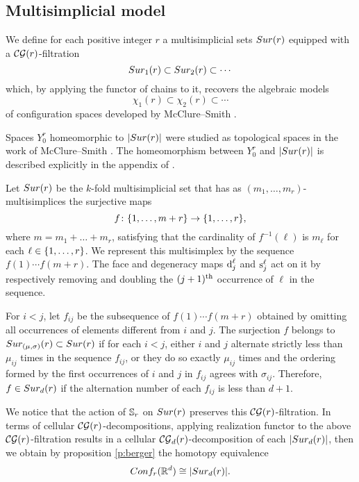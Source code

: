 
\subsection{Multisimplicial model}\label{ss:surjection model}

We define for each positive integer $r$ a multisimplicial sets $Sur(r)$ equipped with a $\mathcal{CG}(r)$-filtration
\[
Sur_{1}(r) \subset Sur_{2}(r) \subset \dotsb
\]
which, by applying the functor of chains to it, recovers the algebraic models
\[
\chi_1(r) \subset \chi_2(r) \subset \dotsb
\]
of configuration spaces developed by McClure--Smith \cite{mcluresmith2004geomodel}.

Spaces $Y_0^r$ homeomorphic to $\lvert Sur(r)\rvert$ were studied as topological spaces in the work of McClure--Smith \cite{mcclure2003multivariable}.
The homeomorphism between $Y_0^r$ and $\lvert Sur(r)\rvert$ is described explicitly in the appendix of \cite{salvatore2009deligne}.

Let $Sur(r)$ be the $k$-fold multisimplicial set that has as $(m_1,\dots,m_r)$-multisimplices the surjective maps
\[
f \colon \{1,\dots,m+r\} \to \{1,\dots,r\},
\]
where $m = m_1+\dots+m_r$, satisfying that the cardinality of $f^{-1}(\ell)$ is $m_\ell$ for each $\ell \in \{1,\dots,r\}$.
We represent this multisimplex by the sequence $f(1) \dotsm f(m+r)$.
The face and degeneracy maps $\operatorname{d}^\ell_j$ and $\operatorname{s}^\ell_j$ act on it by respectively removing and doubling the $(j+1)^{\mathrm{th}}$ occurrence of $\ell$ in the sequence.

For $i<j$, let $f_{ij}$ be the subsequence of $f(1) \dotsm f(m+r)$ obtained by omitting all occurrences of elements different from $i$ and $j$.
The surjection $f$ belongs to $Sur_{(\mu,\sigma)}(r) \subset Sur(r)$ if for each $i<j$, either $i$ and $j$ alternate strictly less than $\mu_{ij}$ times in the sequence $f_{ij}$, or they do so exactly $\mu_{ij}$ times and the ordering formed by the first occurrences of $i$ and $j$ in $f_{ij}$ agrees with $\sigma_{ij}$.
Therefore, $f \in Sur_{d}(r)$ if the alternation number of each $f_{ij}$ is less than $d+1$.

We notice that the action of $\mathbb{S}_r$ on $Sur(r)$ preserves this $\mathcal{CG}(r)$-filtration.
In terms of cellular $\mathcal{CG}(r)$-decompositions, applying realization functor to the above $\mathcal{CG}(r)$-filtration results in a cellular $\mathcal{CG}_d(r)$-decomposition of each $\lvert Sur_{d}(r)\rvert$, then we obtain by proposition \ref{p:berger} the homotopy equivalence
$$Conf_{r}(\mathbb{R}^{d})\cong \lvert Sur_{d}(r)\rvert.$$

